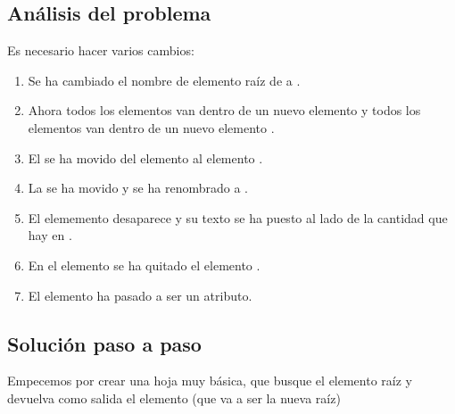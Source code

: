 \documentclass[letterpaper,10pt,spanish]{sphinxmanual}
\begin{document}
\subsection{Análisis del problema}
\label{\detokenize{ejercicios/xslt/anexo_ejercicios_xslt:analisis-del-problema}}
Es necesario hacer varios cambios:
\begin{enumerate}
\item {} 
Se ha cambiado el nombre de elemento raíz de  a .

\item {} 
Ahora todos los elementos  van dentro de un nuevo elemento  y todos los elementos  van dentro de un nuevo elemento .

\item {} 
El  se ha movido del elemento  al elemento .

\item {} 
La  se ha movido y se ha renombrado a .

\item {} 
El elememento  desaparece y su texto se ha puesto al lado de la cantidad que hay en .

\item {} 
En el elemento  se ha quitado el elemento .

\item {} 
El elemento  ha pasado a ser un atributo.

\end{enumerate}


\subsection{Solución paso a paso}
\label{\detokenize{ejercicios/xslt/anexo_ejercicios_xslt:solucion-paso-a-paso}}
Empecemos por crear una hoja muy básica, que busque el elemento raíz y devuelva como salida el elemento  (que va a ser la nueva raíz)

\begin{sphinxVerbatim}[commandchars=\\\{\}]
 
 
\end{sphinxVerbatim}
\end{document}

